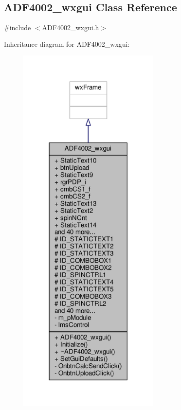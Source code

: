 \subsection{A\+D\+F4002\+\_\+wxgui Class Reference}
\label{classADF4002__wxgui}


{\ttfamily \#include $<$A\+D\+F4002\+\_\+wxgui.\+h$>$}



Inheritance diagram for A\+D\+F4002\+\_\+wxgui\+:
\nopagebreak
\begin{figure}[H]
\begin{center}
\leavevmode
\includegraphics[width=200pt]{d2/d3d/classADF4002__wxgui__inherit__graph}
\end{center}
\end{figure}


